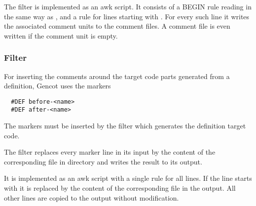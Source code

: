 The filter is implemented as an awk script. It consists of a 
BEGIN rule reading  in the same way as , and a rule for lines starting with 
. For every such line it writes the associated comment units to the comment files. A comment
file is even written if the comment unit is empty.

\subsubsection{Filter }

For inserting the comments around the target code parts generated from a definition, Gencot uses the markers
\begin{verbatim}
  #DEF before-<name>
  #DEF after-<name>
\end{verbatim}
The markers must be inserted by the filter which generates the definition target code.

The filter  replaces every marker line in its input by the content of the corresponding
 file in directory  and writes the result to its output.

It is implemented as an awk script with a single rule for all lines. If the line starts with  it is
replaced by the content of the corresponding file in the output. All other lines are copied to the output without 
modification.

 
